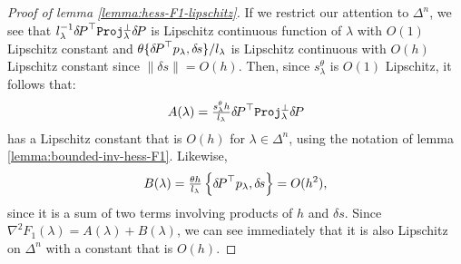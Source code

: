 \documentclass[smallcondensed]{svjour3}
\begin{document}
\begin{proof}[Proof of lemma \ref{lemma:hess-F1-lipschitz}]
  If we restrict our attention to $\Delta^n$, we see that
  $l_\lambda^{-1} {\delta \hspace{-0.14em} P}^\top \mathtt{Proj}_\lambda^\perp {\delta \hspace{-0.14em} P}$ is
  Lipschitz continuous function of $\lambda$ with $O(1)$ Lipschitz
  constant and $\theta \{{{\delta \hspace{-0.14em} P}}^\top p_\lambda, {\delta \hspace{-0.1em} s}\} /l_{\lambda}$
  is Lipschitz continuous with $O(h)$ Lipschitz constant since
  $\|\delta s\| = O(h)$. Then, since $s^\theta_\lambda$ is $O(1)$
  Lipschitz, it follows that:
  \begin{equation}
    A(\lambda) = \tfrac{s^\theta_\lambda h}{l_\lambda} {\delta \hspace{-0.14em} P}^\top
    \mathtt{Proj}^\perp_\lambda {\delta \hspace{-0.14em} P}
  \end{equation}
  has a Lipschitz constant that is $O(h)$ for $\lambda \in \Delta^n$,
  using the notation of lemma
  \ref{lemma:bounded-inv-hess-F1}. Likewise,
  \begin{equation}
    B(\lambda) = \tfrac{\theta h}{l_\lambda} \left\{{\delta \hspace{-0.14em} P}^\top
      p_\lambda, {\delta \hspace{-0.1em} s}\right\} = O(h^2),
  \end{equation}
  since it is a sum of two terms involving products of $h$ and
  $\delta s$. Since $\nabla^2 F_1(\lambda) = A(\lambda) + B(\lambda)$,
  we can see immediately that it is also Lipschitz on $\Delta^n$ with
  a constant that is $O(h)$.
\end{proof}
\end{document}
